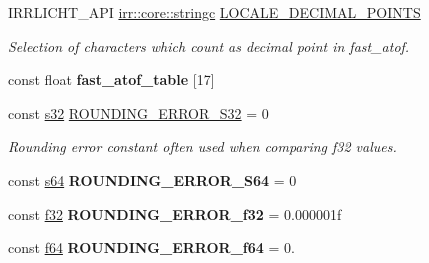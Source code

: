 \begin{DoxyCompactItemize}
\item 
I\+R\+R\+L\+I\+C\+H\+T\+\_\+\+A\+PI \hyperlink{namespaceirr_1_1core_ade1071a878633f2f6d8a75c5d11fec19}{irr\+::core\+::stringc} \hyperlink{namespaceirr_1_1core_ac9e193c6850509dfee97f942b5f121a5}{L\+O\+C\+A\+L\+E\+\_\+\+D\+E\+C\+I\+M\+A\+L\+\_\+\+P\+O\+I\+N\+TS}\hypertarget{namespaceirr_1_1core_ac9e193c6850509dfee97f942b5f121a5}{}\label{namespaceirr_1_1core_ac9e193c6850509dfee97f942b5f121a5}

\begin{DoxyCompactList}\small\item\em Selection of characters which count as decimal point in fast\+\_\+atof. \end{DoxyCompactList}\item 
const float {\bfseries fast\+\_\+atof\+\_\+table} \mbox{[}17\mbox{]}
\item 
const \hyperlink{namespaceirr_ac66849b7a6ed16e30ebede579f9b47c6}{s32} \hyperlink{namespaceirr_1_1core_aac9f99b6a999bdf25fec402c59e8342a}{R\+O\+U\+N\+D\+I\+N\+G\+\_\+\+E\+R\+R\+O\+R\+\_\+\+S32} = 0\hypertarget{namespaceirr_1_1core_aac9f99b6a999bdf25fec402c59e8342a}{}\label{namespaceirr_1_1core_aac9f99b6a999bdf25fec402c59e8342a}

\begin{DoxyCompactList}\small\item\em Rounding error constant often used when comparing f32 values. \end{DoxyCompactList}\item 
const \hyperlink{namespaceirr_abf54bd535f8d4dd996270e68c3ad8c08}{s64} {\bfseries R\+O\+U\+N\+D\+I\+N\+G\+\_\+\+E\+R\+R\+O\+R\+\_\+\+S64} = 0\hypertarget{namespaceirr_1_1core_acc1ea39594c72f97ff196e97c14ed6f3}{}\label{namespaceirr_1_1core_acc1ea39594c72f97ff196e97c14ed6f3}

\item 
const \hyperlink{namespaceirr_a0277be98d67dc26ff93b1a6a1d086b07}{f32} {\bfseries R\+O\+U\+N\+D\+I\+N\+G\+\_\+\+E\+R\+R\+O\+R\+\_\+f32} = 0.\+000001f\hypertarget{namespaceirr_1_1core_a9514dd34463a30102ef8836915cf9c4c}{}\label{namespaceirr_1_1core_a9514dd34463a30102ef8836915cf9c4c}

\item 
const \hyperlink{namespaceirr_a1325b02603ad449f92c68fc640af9b28}{f64} {\bfseries R\+O\+U\+N\+D\+I\+N\+G\+\_\+\+E\+R\+R\+O\+R\+\_\+f64} = 0.\hypertarget{namespaceirr_1_1core_a7b314c22d6804639cbcbce5231724f0b}{}\label{namespaceirr_1_1core_a7b314c22d6804639cbcbce5231724f0b}


\end{DoxyCompactItemize}
